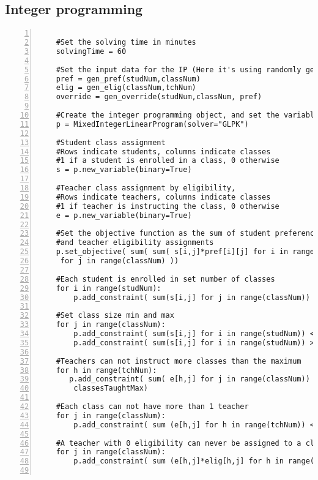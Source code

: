 \documentclass[11pt]{article}
\begin{document}
\subsection{Integer programming}
\begin{lstlisting}[numbers=left,numberstyle=\tiny,numbersep=0pt]

    #Set the solving time in minutes
    solvingTime = 60
    
    #Set the input data for the IP (Here it's using randomly generated data)
    pref = gen_pref(studNum,classNum)
    elig = gen_elig(classNum,tchNum)
    override = gen_override(studNum,classNum, pref)
    
    #Create the integer programming object, and set the variables.
    p = MixedIntegerLinearProgram(solver="GLPK")
    
    #Student class assignment
    #Rows indicate students, columns indicate classes
    #1 if a student is enrolled in a class, 0 otherwise
    s = p.new_variable(binary=True)
    
    #Teacher class assignment by eligibility,
    #Rows indicate teachers, columns indicate classes
    #1 if teacher is instructing the class, 0 otherwise
    e = p.new_variable(binary=True)
    
    #Set the objective function as the sum of student preference
    #and teacher eligibility assignments
    p.set_objective( sum( sum( s[i,j]*pref[i][j] for i in range(studNum)) for j in range(classNum)) + sum( sum( e[h,j]*elig[h,j] for h in range (tchNum))
     for j in range(classNum) ))
    
    #Each student is enrolled in set number of classes
    for i in range(studNum):
        p.add_constraint( sum(s[i,j] for j in range(classNum)) == classesTaken)
    
    #Set class size min and max
    for j in range(classNum):
        p.add_constraint( sum(s[i,j] for i in range(studNum)) <= classSizeMax)
        p.add_constraint( sum(s[i,j] for i in range(studNum)) >= classSizeMin)
    
    #Teachers can not instruct more classes than the maximum    
    for h in range(tchNum):
       p.add_constraint( sum( e[h,j] for j in range(classNum)) <=
        classesTaughtMax)
     
    #Each class can not have more than 1 teacher   
    for j in range(classNum):
        p.add_constraint( sum (e[h,j] for h in range(tchNum)) <= 1)

    #A teacher with 0 eligibility can never be assigned to a class
    for j in range(classNum):
        p.add_constraint( sum (e[h,j]*elig[h,j] for h in range(tchNum)) >= 0)
    

\end{lstlisting}
\end{document}
